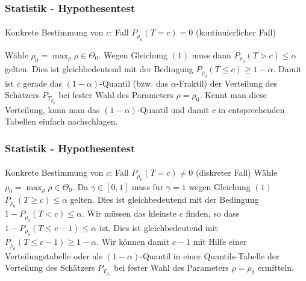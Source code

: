 \documentclass{beamer}
\begin{document}
\begin{frame}
    \frametitle{Statistik - Hypothesentest}
\framesubtitle{}

\begin{block}{Konkrete Bestimmung von $c$: Fall  $P_{\rho_0}(T  = c) = 0$ (kontinuierlicher Fall)}

Wähle $\rho_0 = \max_{\rho} \rho \in \Theta_0$. Wegen  Gleichung $(1)$   muss dann $P_{\rho_0}(T  > c) \leq \alpha$ gelten.  Dies ist gleichbedeutend mit der Bedingung $P_{\rho_0}(T  \leq c)  \geq 1 - \alpha$. Damit ist $c$ gerade das $(1-\alpha)$-Quantil (bzw. das $\alpha$-Fraktil) der Verteilung des Schätzers $P_{T_{\rho_0}}$ bei fester Wahl des Parameters $\rho = \rho_0$. Kennt man diese Verteilung, kann man das  $(1-\alpha)$-Quantil und damit $c$ in entsprechenden Tabellen einfach nachschlagen.  
\end{block}


 \end{frame}
\begin{frame}
    \frametitle{Statistik - Hypothesentest}
\framesubtitle{}

\begin{block}{Konkrete Bestimmung von $c$: Fall  $P_{\rho_0}(T  = c) \neq 0$ (diskreter Fall)}
Wähle $\rho_0 = \max_{\rho} \rho \in \Theta_0$. Da $\gamma \in [0,1]$ muss  für $\gamma =1$ wegen Gleichung $(1)$  $P_{\rho_0}(T  \geq c)  \leq \alpha$ gelten.  Dies ist gleichbedeutend mit der Bedingung $1 - P_{\rho_0}(T  < c)  \leq \alpha$. Wir müssen das kleinste $c$ finden, so dass $1 - P_{\rho_0}(T  \leq c -1)  \leq \alpha$ ist.  Dies ist gleichbedeutend mit  $P_{\rho_0}(T  \leq c -1)  \geq 1- \alpha$. Wir können damit $c-1$ mit Hilfe einer Verteilungstabelle oder als $(1-\alpha)$-Quantil in einer Quantils-Tabelle  der Verteilung des Schätzers $P_{T_{\rho_0}}$ bei fester Wahl des Parameters $\rho = \rho_0$ ermitteln.

\end{block}


 \end{frame}
\end{document}
